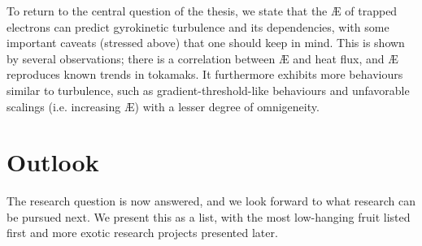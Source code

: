 To return to the central question of the thesis, we state that the \AE{} of trapped electrons can predict gyrokinetic turbulence and its dependencies, with some important caveats (stressed above) that one should keep in mind. This is shown by several observations; there is a correlation between \AE{} and heat flux, and \AE{} reproduces known trends in tokamaks. It furthermore exhibits more behaviours similar to turbulence, such as gradient-threshold-like behaviours and unfavorable scalings (i.e. increasing \AE{}) with a lesser degree of omnigeneity.

\section{Outlook}
The research question is now answered, and we look forward to what research can be pursued next. We present this as a list, with the most low-hanging fruit listed first and more exotic research projects presented later.
